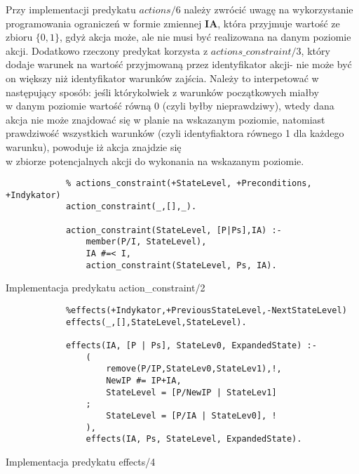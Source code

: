     Przy implementacji predykatu $actions/6$ należy zwrócić uwagę na wykorzystanie programowania ograniczeń w formie zmiennej \textbf{IA}, 
    która przyjmuje wartość ze zbioru $\{0,1\}$, gdyż akcja może, ale nie musi być realizowana na danym poziomie akcji. Dodatkowo rzeczony 
    predykat korzysta z $actions\_constraint/3$, który dodaje warunek na wartość przyjmowaną przez identyfikator akcji- nie może być on większy 
    niż identyfikator warunków zajścia. Należy to interpetować w następujący sposób: jeśli którykolwiek z warunków początkowych miałby \\
    w danym 
    poziomie wartość równą 0 (czyli byłby nieprawdziwy), wtedy dana akcja nie może znajdować się w planie na wskazanym poziomie, natomiast 
    prawdziwość wszystkich warunków (czyli identyfiaktora równego 1 dla każdego warunku), powoduje iż akcja znajdzie się \\
    w zbiorze potencjalnych
    akcji do wykonania na wskazanym poziomie.

    \begin{listing}[H]
        \begin{verbatim}
            % actions_constraint(+StateLevel, +Preconditions, +Indykator)
            action_constraint(_,[],_).

            action_constraint(StateLevel, [P|Ps],IA) :-
                member(P/I, StateLevel),
                IA #=< I,
                action_constraint(StateLevel, Ps, IA).
    \end{verbatim}
    \caption{Implementacja predykatu action\_constraint/2}
    \end{listing}

    \begin{listing}[H]
        \begin{verbatim}
            %effects(+Indykator,+PreviousStateLevel,-NextStateLevel)
            effects(_,[],StateLevel,StateLevel).

            effects(IA, [P | Ps], StateLev0, ExpandedState) :-
                (
                    remove(P/IP,StateLev0,StateLev1),!,
                    NewIP #= IP+IA,
                    StateLevel = [P/NewIP | StateLev1]
                ;
                    StateLevel = [P/IA | StateLev0], !
                ),
                effects(IA, Ps, StateLevel, ExpandedState).
    \end{verbatim}
    \caption{Implementacja predykatu effects/4}
    \end{listing}
    
